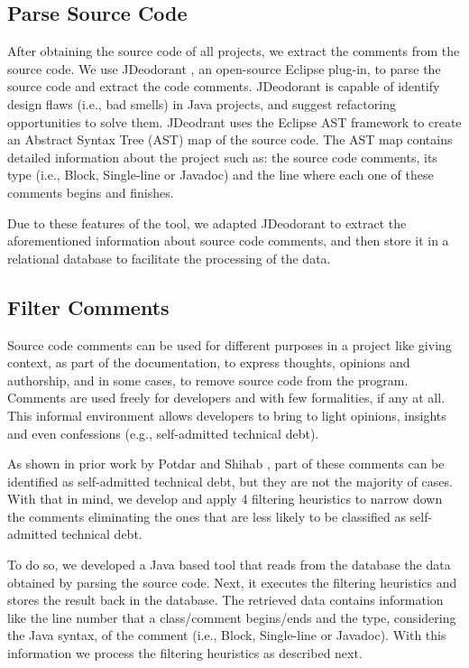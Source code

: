 \subsection{Parse Source Code} %
\label{sub:parse_source_code}

After obtaining the source code of all projects, we extract the comments from the source code. We use JDeodorant \cite{Tsantalis2008CSMR}, an open-source Eclipse plug-in, to parse the source code and extract the code comments. JDeodorant is capable of identify design flaws (i.e., bad smells) in Java projects, and suggest refactoring opportunities to solve them. JDeodrant uses the Eclipse AST framework to create an Abstract Syntax Tree (AST) map of the source code. The AST map contains detailed information about the project such as: the source code comments, its type (i.e., Block, Single-line or Javadoc) and the line where each one of these comments begins and finishes. 

Due to these features of the tool, we adapted JDeodorant to extract the aforementioned information about source code comments, and then store it in a relational database to facilitate the processing of the data.

\subsection{Filter Comments} %
\label{sub:filter_comments}

Source code comments can be used for different purposes in a project like giving context, as part of the documentation, to express thoughts, opinions and authorship, and in some cases, to remove source code from the program. Comments are used freely for developers and with few formalities, if any at all. This informal environment allows developers to bring to light opinions, insights and even confessions (e.g., self-admitted technical debt). 

As shown in prior work by Potdar and Shihab \cite{Potdar2014ICSME}, part of these comments can be identified as self-admitted technical debt, but they are not the majority of cases. With that in mind, we develop and apply 4 filtering heuristics to narrow down the comments eliminating the ones that are less likely to be classified as self-admitted technical debt.

To do so, we developed a Java based tool that reads from the database the data obtained by parsing the source code. Next, it executes the filtering heuristics and stores the result back in the database. The retrieved data contains information like the line number that a class/comment begins/ends and the type, considering the Java syntax, of the comment (i.e., Block, Single-line or Javadoc). With this information we process the filtering heuristics as described next.

